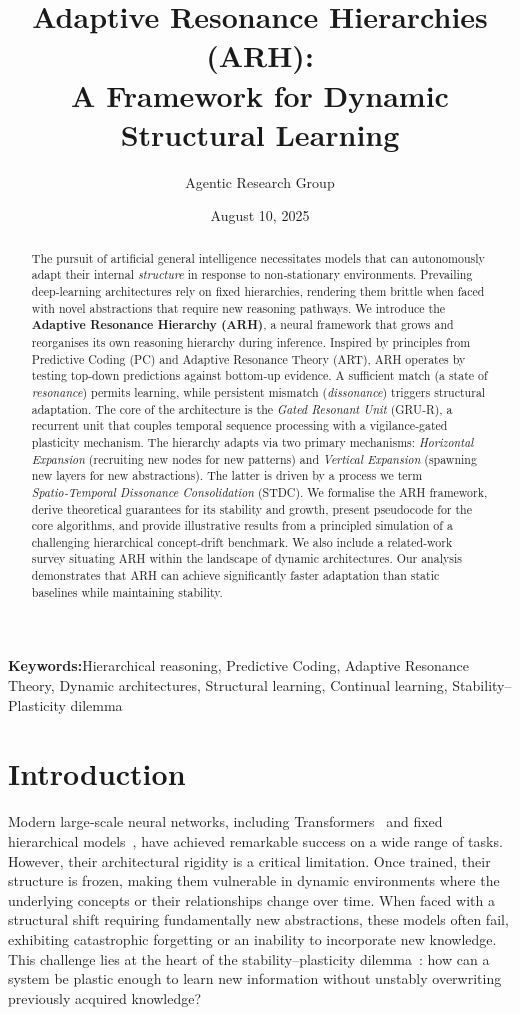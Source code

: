 \documentclass{article}
\title{Adaptive Resonance Hierarchies (ARH):\\A Framework for Dynamic Structural Learning}
\author{Agentic Research Group}
\date{August 10, 2025}
\newcommand{\keywords}[1]{\par\addvspace\baselineskip\noindent\textbf{Keywords:}\enspace\ignorespaces#1}
\begin{document}
\maketitle

\begin{abstract}
The pursuit of artificial general intelligence necessitates models that can autonomously adapt their internal \emph{structure} in response to non‑stationary environments.  Prevailing deep‑learning architectures rely on fixed hierarchies, rendering them brittle when faced with novel abstractions that require new reasoning pathways.  We introduce the \textbf{Adaptive Resonance Hierarchy (ARH)}, a neural framework that grows and reorganises its own reasoning hierarchy during inference.  Inspired by principles from Predictive Coding (PC) and Adaptive Resonance Theory (ART), ARH operates by testing top‑down predictions against bottom‑up evidence.  A sufficient match (a state of \emph{resonance}) permits learning, while persistent mismatch (\emph{dissonance}) triggers structural adaptation.  The core of the architecture is the \emph{Gated Resonant Unit} (GRU‑R), a recurrent unit that couples temporal sequence processing with a vigilance‑gated plasticity mechanism.  The hierarchy adapts via two primary mechanisms: \emph{Horizontal Expansion} (recruiting new nodes for new patterns) and \emph{Vertical Expansion} (spawning new layers for new abstractions).  The latter is driven by a process we term \emph{Spatio‑Temporal Dissonance Consolidation} (STDC).  We formalise the ARH framework, derive theoretical guarantees for its stability and growth, present pseudocode for the core algorithms, and provide illustrative results from a principled simulation of a challenging hierarchical concept‑drift benchmark.  We also include a related‑work survey situating ARH within the landscape of dynamic architectures.  Our analysis demonstrates that ARH can achieve significantly faster adaptation than static baselines while maintaining stability.
\end{abstract}

\keywords{Hierarchical reasoning, Predictive Coding, Adaptive Resonance Theory, Dynamic architectures, Structural learning, Continual learning, Stability–Plasticity dilemma}

\section{Introduction}
Modern large‑scale neural networks, including Transformers \citep{Transformer2017} and fixed hierarchical models \citep{HRM2025}, have achieved remarkable success on a wide range of tasks.  However, their architectural rigidity is a critical limitation.  Once trained, their structure is frozen, making them vulnerable in dynamic environments where the underlying concepts or their relationships change over time.  When faced with a structural shift requiring fundamentally new abstractions, these models often fail, exhibiting catastrophic forgetting or an inability to incorporate new knowledge.  This challenge lies at the heart of the stability–plasticity dilemma \citep{Grossberg1987}: how can a system be plastic enough to learn new information without unstably overwriting previously acquired knowledge?
\end{document}

